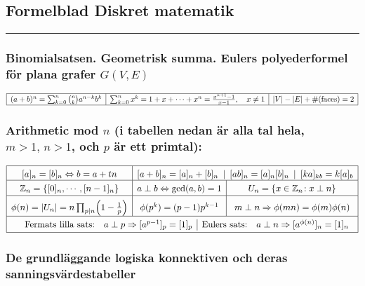 \documentclass{article}
\let\ergo\Longrightarrow
\newcommand\binom[2]{{#1\choose #2}}
\def\Zone{{\mathbb Z}}
\let\iff\Leftrightarrow
\let\ergo\Rightarrow
\begin{document}
\subsection*{Formelblad Diskret matematik}
\hrule
\bigskip

\subsubsection*{Binomialsatsen. Geometrisk summa. Eulers polyederformel för plana grafer $G(V,E)$} %
\vspace{-2em}
\[
  \begin{array}[t]{|l|l|l|}
\hline
  (a+b)^n = \sum_{k=0}^{n} \binom{n}{k} a^{n-k}b^k &
  \sum_{k=0}^{n} x^k = 1 + x  + \cdots +x^n = \frac{x^{n+1}-1}{x-1},\quad x \neq 1 &
  |V|-|E|+ \#(\mbox{faces}) = 2
\\\hline
  \end{array}
\]%

\subsubsection*{Arithmetic mod $n$ %
\textnormal{(i tabellen nedan är alla tal hela, $m>1,\,n>1$, och $p$ är ett primtal):}}
\vspace{-2.2em}
\[
  \begin{array}[t]{|*{4}{c|}}
    \hline \rule{0pt}{12pt}
      [a]_n=[b]_n\iff b = a+tn
    &
    \multicolumn{2}{c|}
    {
    [a+b]_n = [a]_n + [b]_n
    \hfill|\hfill
    [ab]_n = [a]_n[b]_n
    \hfill|\hfill
    [ka]_{kb}=k[a]_b
    }
    \cr\hline \rule{0pt}{12pt}
      \Zone_n=\{[0]_n,\cdots,[n-1]_n\}
    & a\perp b \iff \gcd(a,b)=1
    & U_n=\{x\in\Zone_n\!: x\perp n\} %
    \\[1pt] \hline
      \rule{0pt}{16pt}
      \phi(n) =  |U_n| = n\prod_{p|n}\Bigl(1-\frac1p\Bigr)
      & \phi(p^k) = (p-1)p^{k-1}
    & m\perp n\ergo \phi(mn)=\phi(m)\phi(n)
    \\ \hline
    \multicolumn{3}{|l|}{\rule{0pt}{12pt}
      \begin{array}[m]{l rl|rl}
        &\mbox{Fermats lilla sats:} & a\perp p\ergo [a^{p-1}]_p=[1]_p
        &\mbox{Eulers sats:}        & a\perp n\ergo [a^{\phi(n)}]_n=[1]_n
      \end{array}
    }
    \\[2pt] \hline
  \end{array}
\]%

\subsubsection*{De grundläggande logiska konnektiven och deras sanningsvärdestabeller}%
\end{document}
